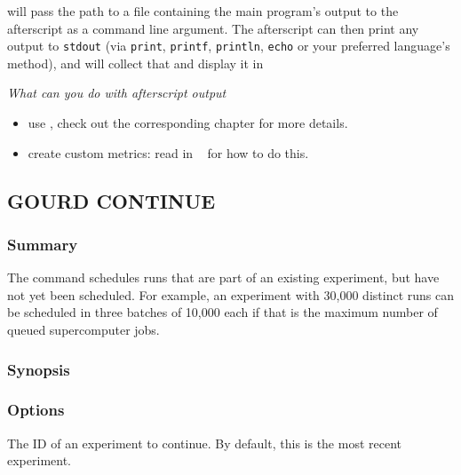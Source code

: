 \documentclass[a4paper,english]{article}
\begin{document}
\begin{adjustwidth}{18pt}{0pt}
                 will pass the path to a file containing the main program's output to the afterscript as a command line argument.
                The afterscript can then print any output to \texttt{stdout} 
                (via \texttt{print}, \texttt{printf}, \texttt{println}, \texttt{echo} or your preferred language's method),
                and  will collect that and display it in 
                ~~~
                
                \emph{What can you do with afterscript output}

                \begin{itemize}
                    \item use , check out the corresponding chapter for more details.
                    \item create custom metrics: read in ~ for how to do this.
                \end{itemize}
        \subsection{GOURD CONTINUE}

            \subsubsection{Summary}
                The   command schedules runs that are part of an existing
                experiment, but have not yet been scheduled.
                For example, an experiment with 30,000 distinct runs can be scheduled in three batches
                of 10,000 each if that is the maximum number of queued supercomputer jobs.

            \subsubsection{Synopsis}
                 

            \subsubsection{Options}
                \begin{Description}[Options]
                  \item[\Arg{experiment-id}]
                    The ID of an experiment to continue.
                    By default, this is the most recent experiment.
                \end{Description}


\end{adjustwidth}
\end{document}
